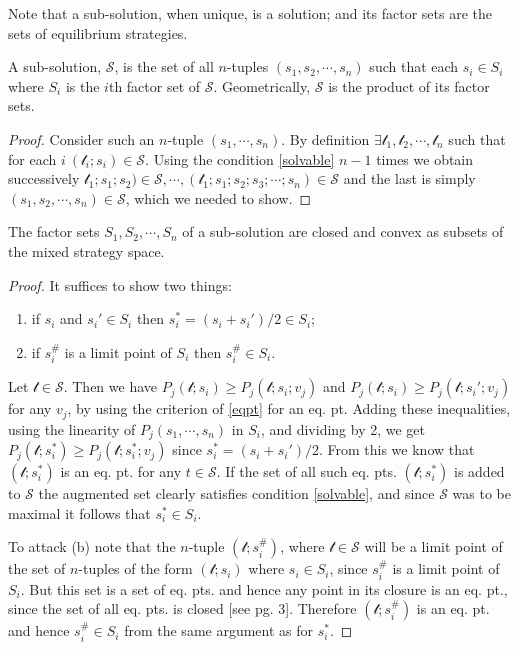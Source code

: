 Note that a sub-solution, when unique, is a solution; and its factor sets are the sets of equilibrium strategies.
\begin{theorem}\label{factor}
    A sub-solution, $\mathcal{S} $, is the set of all $n$-tuples $(s_1,s_2,\cdots ,s_n )$ such that each $s_i \in S_i $ where $S_i $ is the $i$th factor set of $\mathcal{S} $. Geometrically, $\mathcal{S} $ is the product of its factor sets.
\end{theorem}
\begin{proof}
    Consider such an $n$-tuple $(s_1,\cdots ,s_n )$. By definition $\exists \mathcal{t}_1 , \mathcal{t_2} ,\cdots ,\mathcal{t}_n $ such that for each $i \ (\mathcal{t} _i ; s_i )\in \mathcal{S} $. Using the condition \eqref{solvable} $n-1$ times we obtain successively $\mathcal{t_1} ;s_1;s_2)\in \mathcal{S} ,\cdots , (\mathcal{t}_1;s_1;s_2;s_3;\cdots ;s_n )\in \mathcal{S} $ and the last is simply $(s_1,s_2,\cdots ,s_n )\in \mathcal{S} $, which we needed to show.
\end{proof}
\begin{theorem}
    The factor sets $S_1,S_2,\cdots ,S_n $ of a sub-solution are closed and convex as subsets of the mixed strategy space.
\end{theorem}
\begin{proof}
    It suffices to show two things: 
    \begin{enumerate}[label=(\alph*)]
        \item if $s_i $ and $s_i '\in S_i $ then $s_i ^*=(s_i +s_i ')/2 \in S_i $;
        \item if $s_i ^{\#}$ is a limit point of $S_i $ then $s_i ^{\#}\in S_i $.
    \end{enumerate}
 \hspace{\parindent}Let $\mathcal{t} \in \mathcal{S} $. Then we have $P_j (\mathcal{t} ;s_i )\geq P_j (\mathcal{t} ;s_i ;v_j )$ and $P_j (\mathcal{t} ;s_i )\geq P_j (\mathcal{t} ;s_i ';v_j)$ for any $v_j $, by using the criterion of \eqref{eqpt} for an eq. pt. Adding these inequalities, using the linearity of $P_j (s_1,\cdots ,s_n )$ in $S_i $, and dividing by 2, we get $P_j (\mathcal{t} ;s_i ^*)\geq P_j (\mathcal{t} ;s_i ^*;v_j )$ since $s_i ^*= (s_i +s_i ')/2$. From this we know that $(\mathcal{t} ;s_i ^*)$ is an eq. pt. for any $t\in \mathcal{S} $. If the set of all such eq. pts. $(\mathcal{t} ;s_i ^*)$ is added to $\mathcal{S} $ the augmented set clearly satisfies condition \eqref{solvable}, and since $\mathcal{S} $ was to be maximal it follows that $s_i ^*\in S_i $.

 To attack (b) note that the $n$-tuple $(\mathcal{t} ;s_i ^{\#})$, where $\mathcal{t} \in \mathcal{S} $ will be a limit point of the set of $n$-tuples of the form $(\mathcal{t} ; s_i )$ where $s_i \in S_i $, since $s_i ^{\#}$ is a limit point of $S_i $. But this set is a set of eq. pts. and hence any point in its closure is an eq. pt., since the set of all eq. pts. is closed [see pg. 3]. Therefore $(\mathcal{t} ; s_i ^{\#})$ is an eq. pt. and hence $s_i ^{\#}\in S_i $ from the same argument as for $s_i ^*$.
\end{proof}
